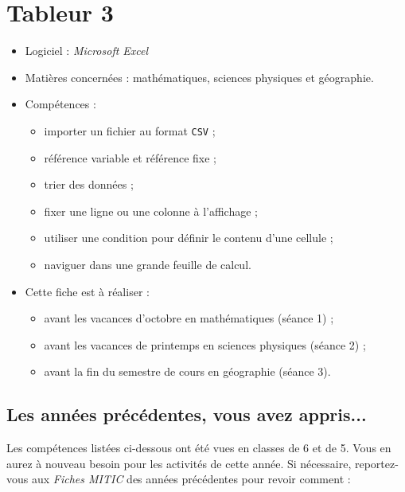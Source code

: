\chapter{Tableur 3}  

{\footnotesize
\begin{itemize}
\item Logiciel : \emph{Microsoft Excel}
\item Matières concernées : mathématiques, sciences physiques et géographie.
\item Compétences : 
        \begin{itemize}
        \item importer un fichier au format \texttt{CSV} ;
        \item référence variable et référence fixe ;
        \item trier des données ;
	\item fixer une ligne ou une colonne à l'affichage ;
	\item utiliser une condition pour définir le contenu d'une cellule ;
	\item naviguer dans une grande feuille de calcul.
        \end{itemize}
\item Cette fiche est à réaliser :
        \begin{itemize}
        \item avant les vacances d'octobre en mathématiques (séance 1) ;
        \item avant les vacances de printemps en sciences physiques (séance 2) ;
        \item avant la fin du semestre de cours en géographie (séance 3). 
        \end{itemize}
\end{itemize}
}%


\section*{Les années précédentes, vous avez appris...}

Les compétences listées ci-dessous ont été vues en classes de 6 et de 5. Vous en aurez à nouveau besoin pour les activités de cette année. Si nécessaire, reportez-vous aux \emph{Fiches MITIC} des années précédentes pour revoir comment :  


